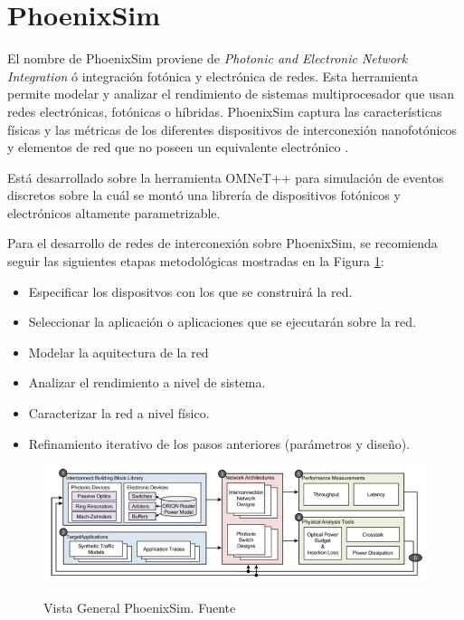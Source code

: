 \section{PhoenixSim}

El nombre de PhoenixSim proviene de \textit{Photonic and Electronic Network Integration} ó 
integración fotónica y electrónica de redes. Esta herramienta permite modelar y 
analizar el rendimiento de sistemas multiprocesador que usan redes electrónicas, fotónicas
o híbridas. PhoenixSim captura las características físicas y las métricas de los diferentes 
dispositivos de interconexión nanofotónicos y elementos de red que no poseen un equivalente
 electrónico \cite{Chan2010}.
 
Está desarrollado sobre la herramienta OMNeT++ para simulación de eventos discretos
\cite{varga2005omnet++} sobre la cuál se montó una librería de dispositivos fotónicos
y electrónicos altamente parametrizable.

Para el desarrollo de redes de interconexión sobre PhoenixSim, se recomienda seguir
las siguientes etapas metodológicas \cite{Chan2011} mostradas en la Figura \ref{fig:phoenix_ovw}:

\begin{itemize}
\item Especificar los dispositvos con los que se construirá la red.
\item Seleccionar la aplicación o aplicaciones que se ejecutarán sobre la red.
\item Modelar la aquitectura de la red
\item Analizar el rendimiento a nivel de sistema.
\item Caracterizar la red a nivel físico.
\item Refinamiento iterativo de los pasos anteriores (parámetros y diseño).
\end{itemize} 

\begin{figure}[H]
\caption{Vista General PhoenixSim. Fuente \cite{Chan2011}}
\centering
\includegraphics[width=1.0\textwidth,natwidth=790,natheight=240]{figs/overview.png}
\label{fig:phoenix_ovw}
\end{figure}


